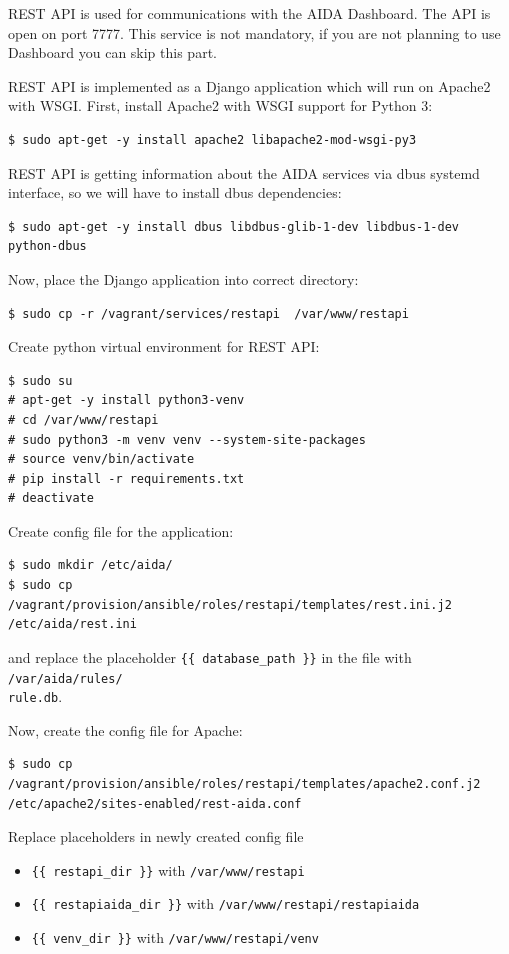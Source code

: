 \documentclass[a4paper]{article} %
\begin{document}
REST API is used for communications with the AIDA Dashboard. The API is open on port 7777. This service is not mandatory, if you are not planning to use Dashboard you can skip this part.

REST API is implemented as a Django application which will run on Apache2 with WSGI. First, install Apache2 with WSGI support for Python 3:
\begin{lstlisting}
$ sudo apt-get -y install apache2 libapache2-mod-wsgi-py3
\end{lstlisting}

REST API is getting information about the AIDA services via dbus systemd interface, so we will have to install dbus dependencies:
\begin{lstlisting}
$ sudo apt-get -y install dbus libdbus-glib-1-dev libdbus-1-dev python-dbus
\end{lstlisting}

Now, place the Django application into correct directory:
\begin{lstlisting}
$ sudo cp -r /vagrant/services/restapi  /var/www/restapi
\end{lstlisting}

Create python virtual environment for REST API:
\begin{lstlisting}
$ sudo su
# apt-get -y install python3-venv
# cd /var/www/restapi
# sudo python3 -m venv venv --system-site-packages
# source venv/bin/activate
# pip install -r requirements.txt
# deactivate
\end{lstlisting}

Create config file for the application:
\begin{lstlisting}
$ sudo mkdir /etc/aida/
$ sudo cp /vagrant/provision/ansible/roles/restapi/templates/rest.ini.j2 /etc/aida/rest.ini
\end{lstlisting}
and replace the placeholder \texttt{\{\{ database\_path \}\}} in the file with \texttt{/var/aida/rules/\\rule.db}.

Now, create the config file for Apache:
\begin{lstlisting}
$ sudo cp /vagrant/provision/ansible/roles/restapi/templates/apache2.conf.j2 /etc/apache2/sites-enabled/rest-aida.conf
\end{lstlisting}
Replace placeholders in newly created config file
\begin{itemize}[noitemsep,nolistsep]
\item \texttt{\{\{ restapi\_dir \}\}} with \texttt{/var/www/restapi}
\item \texttt{\{\{ restapiaida\_dir \}\}} with \texttt{/var/www/restapi/restapiaida}
\item \texttt{\{\{ venv\_dir \}\}} with \texttt{/var/www/restapi/venv}
\end{itemize}
\end{document}
